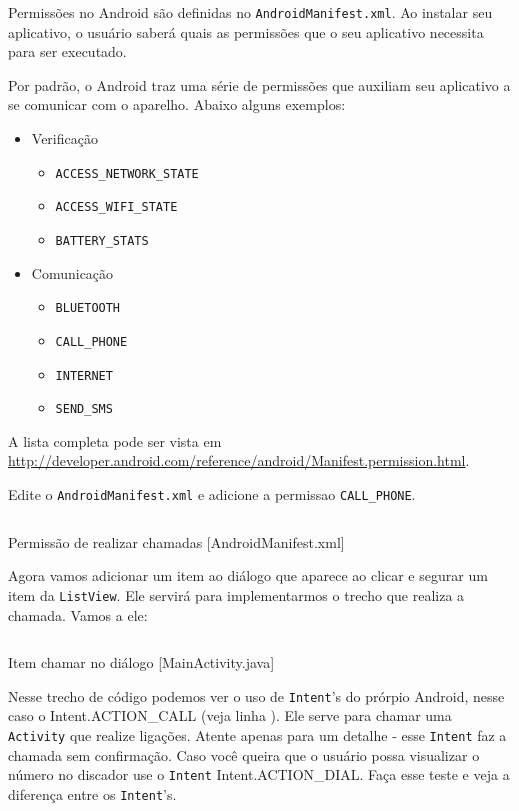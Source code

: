 Permissões no Android são definidas no \texttt{AndroidManifest.xml}. Ao
instalar seu aplicativo, o usuário saberá quais as permissões que o seu
aplicativo necessita para ser executado.

Por padrão, o Android traz uma série de permissões que auxiliam seu
aplicativo a se comunicar com o aparelho. Abaixo alguns exemplos:

\begin{itemize}
\item
  Verificação
  \begin{itemize}
  \item
    \texttt{ACCESS\_NETWORK\_STATE}
  \item
    \texttt{ACCESS\_WIFI\_STATE}
  \item
    \texttt{BATTERY\_STATS}
  \end{itemize}
\item
  Comunicação
  \begin{itemize}
  \item
    \texttt{BLUETOOTH}
  \item
    \texttt{CALL\_PHONE}
  \item
    \texttt{INTERNET}
  \item
    \texttt{SEND\_SMS}
  \end{itemize}
\end{itemize}
A lista completa pode ser vista em
\url{http://developer.android.com/reference/android/Manifest.permission.html}.

Edite o \texttt{AndroidManifest.xml} e adicione a permissao
\texttt{CALL\_PHONE}.

\begin{listing}[H]
  \inputminted[linenos=true,frame=bottomline,tabsize=3]{ xml }{ source/AndroidManifest-3.xml }
  \caption{Permissão de realizar chamadas [AndroidManifest.xml]}
\end{listing}

Agora vamos adicionar um item ao diálogo que aparece ao clicar e segurar
um item da \texttt{ListView}. Ele servirá para implementarmos o trecho
que realiza a chamada. Vamos a ele:

\begin{listing}[H]
  \inputminted[linenos=true,frame=bottomline,tabsize=3]{ java }{ source/MainActivity-10.java }
  \caption{Item chamar no diálogo [MainActivity.java]}
\end{listing}

Nesse trecho de código podemos ver o uso de \texttt{Intent}'s do prórpio
Android, nesse caso o Intent.ACTION\_CALL (veja linha ). Ele
serve para chamar uma \texttt{Activity} que realize ligações. Atente
apenas para um detalhe - esse \texttt{Intent} faz a chamada sem
confirmação. Caso você queira que o usuário possa visualizar o número no
discador use o \texttt{Intent} Intent.ACTION\_DIAL. Faça esse teste e
veja a diferença entre os \texttt{Intent}'s.

